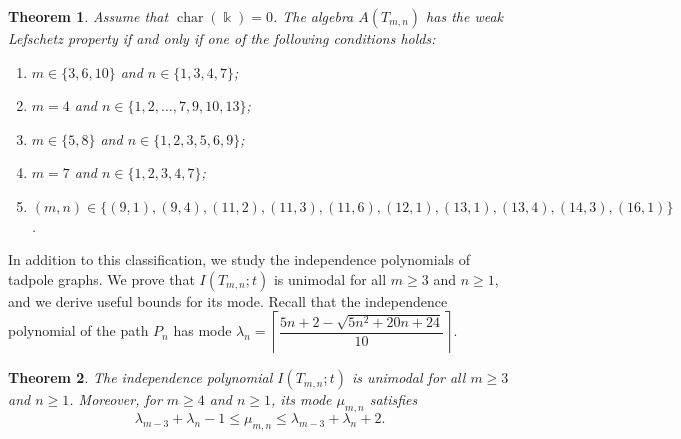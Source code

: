 \documentclass[12pt]{amsart}
\newtheorem{theorem}{Theorem}[section]
\begin{document}
\begin{theorem}\label{thm:main}
Assume that $\operatorname{char}(\Bbbk)=0$. The algebra $A(T_{m,n})$ has the weak Lefschetz property if and only if one of the following conditions holds:
\begin{enumerate}
\item[(i)] $m\in\{3,6,10\}$ and $n\in\{1,3,4,7\}$;
\item[(ii)] $m=4$ and $n\in\{1,2,\ldots,7,9,10,13\}$;
\item[(iii)] $m\in\{5,8\}$ and $n\in\{1,2,3,5,6,9\}$;
\item[(iv)] $m=7$ and $n\in\{1,2,3,4,7\}$;
\item[(v)] $(m,n)\in\{(9,1),(9,4),(11,2),(11,3),(11,6),(12,1),(13,1),(13,4),(14,3),(16,1)\}$.
\end{enumerate}
\end{theorem}

In addition to this classification, we study the independence polynomials of tadpole graphs. We prove that $I(T_{m,n};t)$ is unimodal for all $m\geq 3$ and $n\geq 1$, and we derive useful bounds for its mode. Recall that the independence polynomial of the path $P_n$ has mode $\lambda_n=\left\lceil\dfrac{5n+2-\sqrt{5n^2+20n+24}}{10}\right\rceil$.

\begin{theorem}\label{thm:unimodal}
The independence polynomial $I(T_{m,n};t)$ is unimodal for all $m\geq 3$ and $n\geq 1$. Moreover, for $m\geq 4$ and $n\geq 1$, its mode $\mu_{m,n}$ satisfies
$$
\lambda_{m-3}+\lambda_n-1\leq \mu_{m,n}\leq \lambda_{m-3}+\lambda_n+2.
$$
\end{theorem}
\end{document}
